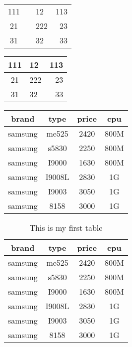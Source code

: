 \documentclass{book} %
\begin{document}
\begin{tabular}{cllr}    %
  111 & & 12 & 113 \\
  21 & & 222 & 23 \\          %
  31 & & 32 & 33  \\
  
\end{tabular}



\begin{tabular}{|c|l|r|}    %
  \hline    %
  111 & 12 & 113 \\         %
  \hline
  21 & 222 & 23 \\          %
  \hline
  31 & 32 & 33 \\
  \hline
\end{tabular}

\eject  %

\begin{tabular}{|cccc|}    
  \hline
brand & type & price & cpu\\
  \hline
samsung & me525 & 2420 & 800M\\
samsung & s5830 & 2250 & 800M\\
samsung & I9000 & 1630 & 800M\\
samsung & I9008L & 2830 & 1G\\
samsung & I9003 & 3050 & 1G\\
samsung & 8158 & 3000 & 1G\\
  \hline
\end{tabular}

\eject  %

\begin{table}
  \centering    %
  \begin{tabular}{|c|c|c|c|}
  \hline
brand & type & price & cpu\\
  \hline
samsung & me525 & 2420 & 800M\\
samsung & s5830 & 2250 & 800M\\
samsung & I9000 & 1630 & 800M\\
samsung & I9008L & 2830 & 1G\\
samsung & I9003 & 3050 & 1G\\
samsung & 8158 & 3000 & 1G\\
  \hline
\end{tabular}
  \caption{This is my first table}  %
\end{table}
\end{document}
